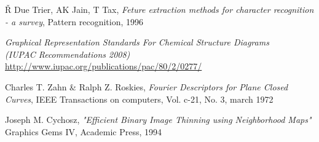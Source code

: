 \begin{thebibliography}{4}

  Ř Due Trier, AK Jain, T Tax, 
  \emph{Feture extraction methods for character recognition - a survey},
  Pattern recognition, 1996

  \emph{Graphical Representation Standards For Chemical Structure Diagrams \\ (IUPAC Recommendations 2008)} \\
  \url{http://www.iupac.org/publications/pac/80/2/0277/}

  Charles T. Zahn \& Ralph Z. Roskies,
  \emph{Fourier Descriptors for Plane Closed Curves},
   IEEE Transactions on computers, Vol. c-21, No. 3, march 1972

  Joseph M. Cychosz,
  \emph{"Efficient Binary Image Thinning using Neighborhood Maps"}
  Graphics Gems IV, Academic Press, 1994

\end{thebibliography}


